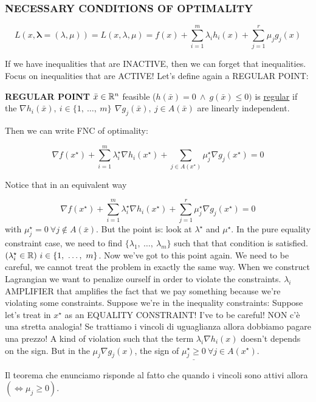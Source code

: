 \subsubsection{NECESSARY CONDITIONS OF OPTIMALITY}

\[
	L(x,\mathbf{\lambda}=(\lambda,\mu)) = L(x,\lambda,\mu) = f(x) + \sum_{i=1}^m{\lambda_ih_i(x)} + \sum_{j=1}^r{\mu_jg_j(x)}
\]

If we have inequalities that are INACTIVE, then we can forget that inequalities. Focus on inequalities that are ACTIVE! Let's define again a REGULAR POINT:

\begin{defn}{\textbf{REGULAR POINT}} \newline
$\bar{x}\in\mathbb{R}^n$ feasible ($h(\bar{x})=0\ \land\ g(\bar{x})\leq 0)$ is \underline{regular} if the $\nabla{h_i(\bar{x})},\ i\in\{1,\ \dots,\ m\}\,\ \nabla{g_j(\bar{x})},\ j\in A(\bar{x})$ are linearly independent.
\end{defn}

Then we can write FNC of optimality:

\[
	\nabla{f(x^\star)} + \sum_{i=1}^m{\lambda_i^\star\nabla{h_i(x^\star)}} + \sum_{j\in A(x^\star)}{\mu_j^\star\nabla{g_j(x^\star)}} = 0
\]

Notice that in an equivalent way

\[
		\nabla{f(x^\star)} + \sum_{i=1}^m{\lambda_i^\star\nabla{h_i(x^\star)}} + \sum_{j=1}^r{\mu_j^\star\nabla{g_j(x^\star)}} = 0
\]
with $\mu_j^\star = 0\ \forall j \notin A(\bar{x})$. But the point is: look at $\lambda^\star$ and $\mu^\star$. In the pure equality constraint case, we need to find $\{\lambda_1,\ \dots,\ \lambda_m\}$ such that that condition is satisfied. $(\lambda_i^\star\in\R)\ i\in\{1,\ \dots,\ m\}$. Now we've got to this point again. We need to be careful, we cannot treat the problem in exactly the same way. When we construct Lagrangian we want to penalize ourself in order to violate the constraints. $\lambda_i$ AMPLIFIER that amplifies the fact that we pay something because we're violating some constraints.
Suppose we're in the inequality constraints: Suppose let's treat in $x^\star$ as an EQUALITY CONSTRAINT! I've to be careful! NON c'è una stretta analogia! Se trattiamo i vincoli di uguaglianza allora dobbiamo pagare una prezzo! A kind of violation such that the term $\lambda_i\nabla{h_i(x)}$ doesn't depends on the sign. But in the $\mu_j\nabla{g_j(x)}$, the sign of $\underline{\mu_j^\star \geq 0}\ \forall j\in A(x^\star)$.

Il teorema che enunciamo risponde al fatto che quando i vincoli sono attivi allora $(\iff \mu_j \geq 0)$. 

